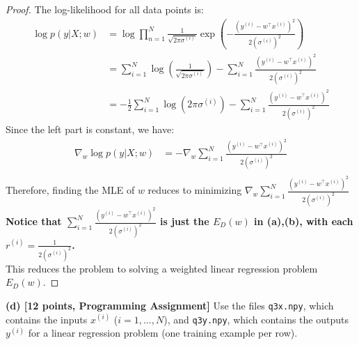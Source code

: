 \documentclass[lang=cn,11pt]{elegantbook}
\begin{document}
\begin{proof}
The log-likelihood for all data points is:
\begin{align*}
\log p(y | X; w) &= \log  \prod_{n=1}^N \frac{1}{\sqrt{2\pi\sigma^{(i)}}}  \exp\left(-\frac{(y^{(i)} - w^\top x^{(i)})^2}{2(\sigma^{(i)})^2}\right)    \\
&= \sum_{i=1}^N \log \left( \frac{1}{\sqrt{2\pi\sigma^{(i)}}} \right) - \sum_{i=1}^N \frac{(y^{(i)} - w^\top x^{(i)})^2}{2 (\sigma^{(i)})^2}   \\
&  =   -\frac{1}{2} \sum_{i=1}^N \log \left( 2\pi\sigma^{(i)} \right) - \sum_{i=1}^N \frac{(y^{(i)} - w^\top x^{(i)})^2}{2 (\sigma^{(i)})^2}  
\end{align*}
Since the left part is constant, we have:
\begin{align*}
    \nabla_w \log p(y | X; w) &=  -\nabla_w  \sum_{i=1}^N \frac{(y^{(i)} - w^\top x^{(i)})^2}{2 (\sigma^{(i)})^2}   \\
\end{align*}
Therefore, finding the MLE of $w$ reduces to minimizing $\nabla_w  \sum_{i=1}^N \frac{(y^{(i)} - w^\top x^{(i)})^2}{2 (\sigma^{(i)})^2}$\\
\textbf{Notice that $\sum_{i=1}^N \frac{(y^{(i)} - w^\top x^{(i)})^2}{2 (\sigma^{(i)})^2}$ is just the $E_D(w)$ in (a),(b), with each $r^{(i)} = \frac{1}{2(\sigma^{(i)})^2}$. }\\
This reduces the problem to solving a weighted linear regression problem \( E_D(w) \).
\end{proof}



\textbf{(d) [12 points, Programming Assignment]} Use the files \texttt{q3x.npy}, which contains the inputs \( x^{(i)} \) (\( i = 1, \dots, N \)), and \texttt{q3y.npy}, which contains the outputs \( y^{(i)} \) for a linear regression problem (one training example per row).
\end{document}
